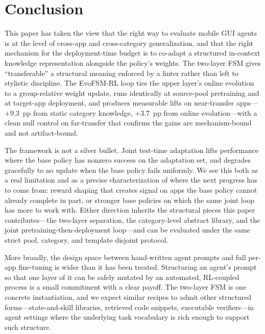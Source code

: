 \section{Conclusion}
\label{sec:conclusion}

This paper has taken the view that the right way to evaluate mobile GUI agents is at the level of cross-app and cross-category generalization, and that the right mechanism for the deployment-time budget is to co-adapt a structured in-context knowledge representation alongside the policy's weights. The two-layer FSM gives ``transferable'' a structural meaning enforced by a linter rather than left to stylistic discipline. The EvoFSM-RL loop ties the upper layer's online evolution to a group-relative weight update, runs identically at source-pool pretraining and at target-app deployment, and produces measurable lifts on near-transfer apps---$+9.3$~pp from static category knowledge, $+3.7$~pp from online evolution---with a clean null control on far-transfer that confirms the gains are mechanism-bound and not artifact-bound.

The framework is not a silver bullet. Joint test-time adaptation lifts performance where the base policy has nonzero success on the adaptation set, and degrades gracefully to no update when the base policy fails uniformly. We see this both as a real limitation and as a precise characterization of where the next progress has to come from: reward shaping that creates signal on apps the base policy cannot already complete in part, or stronger base policies on which the same joint loop has more to work with. Either direction inherits the structural pieces this paper contributes---the two-layer separation, the category-level abstract library, and the joint pretraining-then-deployment loop---and can be evaluated under the same strict pool, category, and template disjoint protocol.

More broadly, the design space between hand-written agent prompts and full per-app fine-tuning is wider than it has been treated. Structuring an agent's prompt so that one layer of it can be safely mutated by an automated, RL-coupled process is a small commitment with a clear payoff. The two-layer FSM is one concrete instantiation, and we expect similar recipes to admit other structured forms---state-and-skill libraries, retrieved code snippets, executable verifiers---in agent settings where the underlying task vocabulary is rich enough to support such structure.
